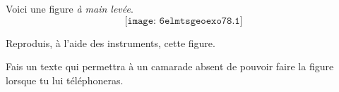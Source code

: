 Voici une figure {\em à main levée}.
\[\texttt{[image: 6elmtsgeoexo78.1]}\]
\begin{myenumerate}
  \item Reproduis, à l'aide des instruments, cette figure.
  \item Fais un texte qui permettra à un camarade absent de pouvoir faire
    la figure lorsque tu lui téléphoneras.
\end{myenumerate}